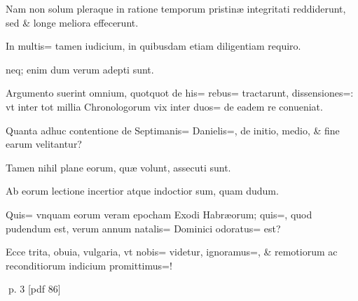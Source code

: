\begin{parnumbers}
Nam non solum pleraque in ratione temporum pristinæ integritati reddiderunt, sed \& longe meliora effecerunt.

In multis= tamen iudicium, in quibusdam etiam diligentiam requiro.

neq; enim dum verum adepti sunt.

Argumento suerint omnium, quotquot de his= rebus= tractarunt, dissensiones=: vt inter tot millia Chronologorum vix inter duos= de eadem re
conueniat.

Quanta adhuc contentione de Septimanis= Danielis=, de initio, medio, \& fine earum velitantur?

Tamen nihil plane eorum, quæ volunt, assecuti sunt.

Ab eorum lectione incertior atque indoctior sum, quam dudum.

Quis= vnquam eorum veram epocham Exodi Habræorum; quis=, quod pudendum est, verum annum natalis= Dominici odoratus= est?

Ecce trita, obuia, vulgaria, vt nobis= videtur, ignoramus=, \& remotiorum ac reconditiorum indicium promittimus=!

\end{parnumbers}
\clearpage
p. 3 [pdf 86]

